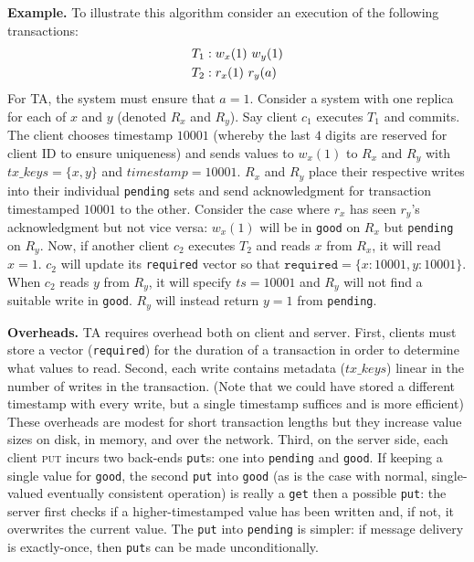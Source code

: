 \vspace{1em}\noindent\textbf{Example.} To illustrate this algorithm consider an execution of the following transactions:
\begin{align*}
\small\vspace{-1em}
T_1 &: w_x(1)~w_y(1)
\\T_2 &: r_x(1)~r_y(a)
\end{align*}
For TA, the system must ensure that $a=1$. Consider a system with one
replica for each of $x$ and $y$ (denoted $R_x$ and $R_y$). Say client
$c_1$ executes $T_1$ and commits. The client chooses timestamp $10001$
(whereby the last $4$ digits are reserved for client ID to ensure
uniqueness) and sends values to $w_x(1)$ to $R_x$ and $R_y$ with
$tx\_keys = \{x,y\}$ and $timestamp=10001$. $R_x$ and $R_y$ place
their respective writes into their individual \texttt{pending} sets
and send acknowledgment for transaction timestamped $10001$ to the
other. Consider the case where $r_x$ has seen $r_y$'s acknowledgment
but not vice versa: $w_x(1)$ will be in \texttt{good} on $R_x$
but \texttt{pending} on $R_y$. Now, if another client $c_2$ executes
$T_2$ and reads $x$ from $R_x$, it will read $x=1$. $c_2$ will update
its \texttt{required} vector so that $\texttt{required}=\{x:10001,
y:10001\}$. When $c_2$ reads $y$ from $R_y$, it will specify
$ts=10001$ and $R_y$ will not find a suitable write
in \texttt{good}. $R_y$ will instead return $y=1$
from \texttt{pending}.

\vspace{1em}\noindent\textbf{Overheads.} TA requires overhead both on client and server. First, clients must store a vector (\texttt{required}) for the duration of a transaction in order to determine what values to read. Second, each write contains metadata ($tx\_keys$) linear in the number of writes in the transaction. (Note that we could have stored a different timestamp with every write, but a single timestamp suffices and is more efficient) These overheads are modest for short transaction lengths but they increase value sizes on disk, in memory, and over the network. Third, on the server side, each client \textsc{put} incurs two back-ends \texttt{put}s: one into \texttt{pending} and \texttt{good}. If keeping a single value for \texttt{good}, the second \texttt{put} into \texttt{good} (as is the case with normal, single-valued eventually consistent operation) is really a \texttt{get} then a possible \texttt{put}: the server first checks if a higher-timestamped value has been written and, if not, it overwrites the current value. The \texttt{put} into \texttt{pending} is simpler: if message delivery is exactly-once, then \texttt{put}s can be made unconditionally.

